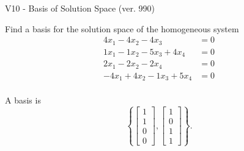 \begin{exercise}
  \begin{exerciseTitle}V10 - Basis of Solution Space (ver. 990)\end{exerciseTitle}
  \begin{exerciseStatement}
    Find a basis for the solution space of the homogeneous system 
\begin{align*}
 4 x_ 1 -4 x_ 2 -4 x_ 3 &= 0  \\ 
  1 x_ 1 -1 x_ 2 -5 x_ 3 + 4 x_ 4 &= 0  \\ 
  2 x_ 1 -2 x_ 2 -2 x_ 4 &= 0  \\ 
  -4 x_ 1 + 4 x_ 2 -1 x_ 3 + 5 x_ 4 &= 0  \\ 
 \end{align*}


 
  \end{exerciseStatement}

  \begin{exerciseAnswer}
   A basis is   
\[\left\{\left[\begin{array}{c}
1 \\
1 \\
0 \\
0
\end{array}\right] , \left[\begin{array}{c}
1 \\
0 \\
1 \\
1
\end{array}\right]\right\}.\]

  


  \end{exerciseAnswer}
\end{exercise}